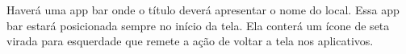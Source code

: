 Haverá uma app bar onde o título deverá apresentar o nome do local. Essa app bar estará posicionada sempre no início da tela. Ela conterá um ícone de seta virada para esquerdade que remete a ação de voltar a tela nos aplicativos.

